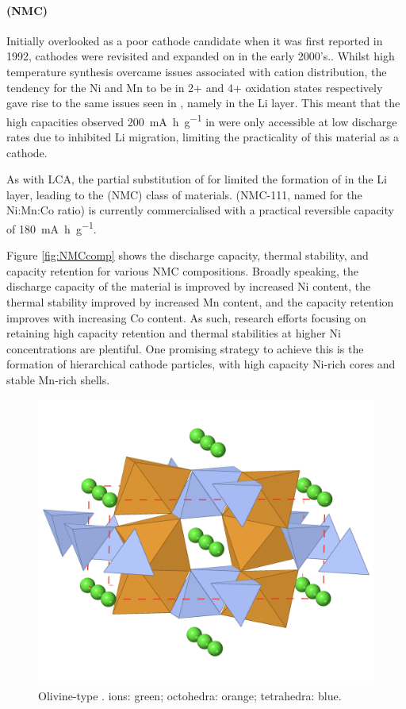 \paragraph{ (NMC)}
Initially overlooked as a poor cathode candidate when it was first reported in 1992,\cite{Rossen1992}  cathodes were revisited and expanded on in the early 2000's.\cite{Lu2001,Yabuuchi2008, Venkatraman2004}.
Whilst high temperature synthesis overcame issues associated with cation distribution,\cite{Hinuma2007} the tendency for the Ni and Mn to be in 2+ and 4+ oxidation states respectively gave rise to the same issues seen in , namely  in the Li layer.
This meant that the high capacities observed \SI{200}{\milli\ampere\hour\per\gram} in  were only accessible at low discharge rates due to inhibited Li migration, limiting the practicality of this material as a cathode.

As with LCA, the partial substitution of  for  limited the formation of  in the Li layer, leading to the  (NMC) class of materials.
 (NMC-111, named for the Ni:Mn:Co ratio) is currently commercialised with a practical reversible capacity of \SI{180}{\milli\ampere\hour\per\gram}.

Figure \ref{fig:NMCcomp} shows the discharge capacity, thermal stability, and capacity retention for various NMC compositions.
Broadly speaking, the discharge capacity of the material is improved by increased Ni content, the thermal stability improved by increased Mn content, and the capacity retention improves with increasing Co content.
As such, research efforts focusing on retaining high capacity retention and thermal stabilities at higher Ni concentrations are plentiful.
One promising strategy to achieve this is the formation of hierarchical cathode particles, with high capacity Ni-rich cores and stable Mn-rich shells. \cite{Zhou2018}
\newpage
\begin{figure}
\centering
\includegraphics[width=0.6\linewidth]{figures/structures/LiFePO4}

\caption[Olivine-type ]{Olivine-type .   ions: green;  octohedra: orange;  tetrahedra: blue.} 
\label{fig:polyanion}
\end{figure}

